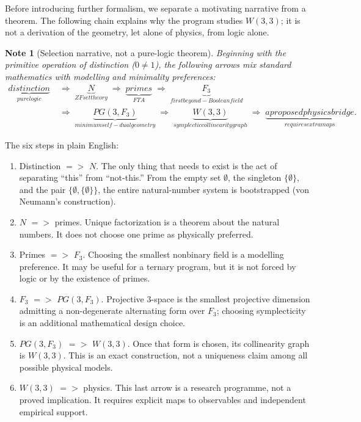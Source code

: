 \documentclass[11pt]{article}
\def\mathbb#1{#1}%
\def\mathrm#1{#1}%
\def\textbf#1{#1}%
\def\text#1{#1}%
\def\Rightarrow{ => }%
\newtheorem*{note}{Note}
\begin{document}
Before introducing further formalism, we separate a motivating narrative from a theorem.  The following chain explains why the program studies $W(3,3)$; it is not a derivation of the geometry, let alone of physics, from logic alone.

\begin{note}[Selection narrative, not a pure-logic theorem]
Beginning with the primitive operation of \textbf{distinction} ($0 \neq 1$), the following arrows mix standard mathematics with modelling and minimality preferences:
\begin{align*}
\underbrace{\text{distinction}}_{\text{pure logic}}
\;&\Longrightarrow\; \underbrace{\mathbb{N}}_{\text{ZF set theory}}
\;\Longrightarrow\; \underbrace{\text{primes}}_{\text{FTA}}
\;\Longrightarrow\; \underbrace{\mathbb{F}_3}_{\text{first beyond-Boolean field}} \\[0.3em]
\;&\Longrightarrow\; \underbrace{\mathrm{PG}(3,\mathbb{F}_3)}_{\text{minimum self-dual geometry}}
\;\Longrightarrow\; \underbrace{W(3,3)}_{\text{symplectic collinearity graph}}
\;\Longrightarrow\; \underbrace{\text{a proposed physics bridge}}_{\text{requires extra maps}}.
\end{align*}
\end{note}

The six steps in plain English:

\begin{enumerate}[leftmargin=2em]
\item \textbf{Distinction $\Rightarrow$ $\mathbb{N}$.} The only thing that needs to exist is the act of separating ``this'' from ``not-this.'' From the empty set $\emptyset$, the singleton $\{\emptyset\}$, and the pair $\{\emptyset, \{\emptyset\}\}$, the entire natural-number system is bootstrapped (von Neumann's construction).
\item \textbf{$\mathbb{N}$ $\Rightarrow$ primes.} Unique factorization is a theorem about the natural numbers.  It does not choose one prime as physically preferred.
\item \textbf{Primes $\Rightarrow$ $\mathbb{F}_3$.} Choosing the smallest nonbinary field is a modelling preference.  It may be useful for a ternary program, but it is not forced by logic or by the existence of primes.
\item \textbf{$\mathbb{F}_3$ $\Rightarrow$ $\mathrm{PG}(3,\mathbb{F}_3)$.} Projective $3$-space is the smallest projective dimension admitting a non-degenerate alternating form over $\mathbb{F}_3$; choosing symplecticity is an additional mathematical design choice.
\item \textbf{$\mathrm{PG}(3,\mathbb{F}_3)$ $\Rightarrow$ $W(3,3)$.} Once that form is chosen, its collinearity graph is $W(3,3)$.  This is an exact construction, not a uniqueness claim among all possible physical models.
\item \textbf{$W(3,3)$ $\Rightarrow$ physics.} This last arrow is a research programme, not a proved implication.  It requires explicit maps to observables and independent empirical support.
\end{enumerate}
\end{document}
